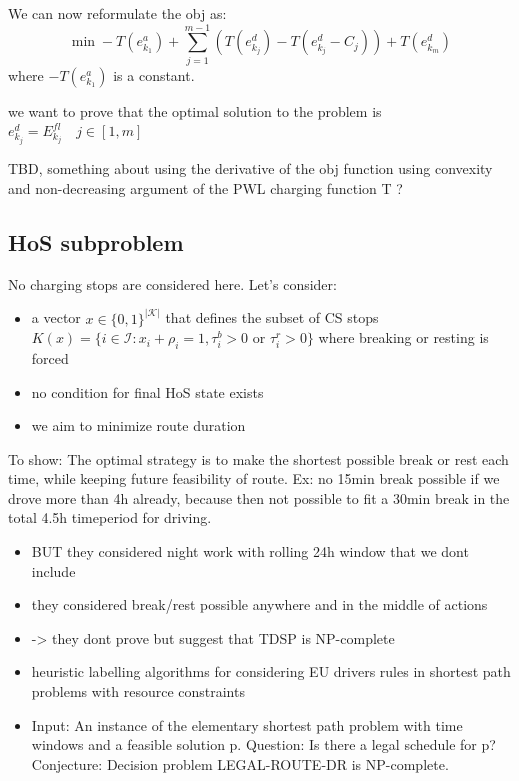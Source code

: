 \documentclass[preprint,12pt,3p]{elsarticle}
\begin{document}
{We can now reformulate the obj as:
\begin{equation}
     \min -T(e^a_{k_1})+\sum_{j=1}^{m-1}(T(e^d_{k_j})-T(e^d_{k_j}-C_{j}))+T(e^d_{k_m})
\end{equation}
where $-T(e^a_{k_1})$ is a constant.

we want to prove that the optimal solution to the problem is $e^d_{k_j}=E^{fl}_{k_j}\quad j \in [1,m]$


{\color{red}TBD, something about using the derivative of the obj function using convexity and non-decreasing argument of the PWL charging function T ?}

\subsection{HoS subproblem}
\noindent No charging stops are considered here. Let's consider:
\begin{itemize}
    \item a vector $x \in \{0,1\}^{|\mathcal K|}$ that defines the subset of CS stops $K(x)=\{i \in \mathcal I : x_i+\rho_i=1, \tau_i^b >0 \text{ or }\tau_i^r > 0\}$ where breaking or resting is forced
    \item no condition for final HoS state exists
    \item we aim to minimize route duration
\end{itemize}

To show: The optimal strategy is to make the shortest possible break or rest each time, while keeping future feasibility of route. Ex: no 15min break possible if we drove more than 4h already, because then not possible to fit a 30min break in the total 4.5h timeperiod for driving.

\noindent \citep{garaix_label-setting_2024}
\begin{itemize}
    \item BUT they considered night work with rolling 24h window that we dont include
    \item they considered break/rest possible anywhere and in the middle of actions
    \item -> they dont prove but suggest that TDSP is NP-complete
\end{itemize}


\noindent \citep{drexl_labelling_2010}
\begin{itemize}
    \item heuristic labelling algorithms for considering EU drivers rules in shortest path problems with resource constraints
    \item Input: An instance of the elementary shortest path problem with time windows and a feasible solution p. Question: Is there a legal schedule for p? Conjecture: Decision problem LEGAL-ROUTE-DR is NP-complete.
\end{itemize}

}
\end{document}
